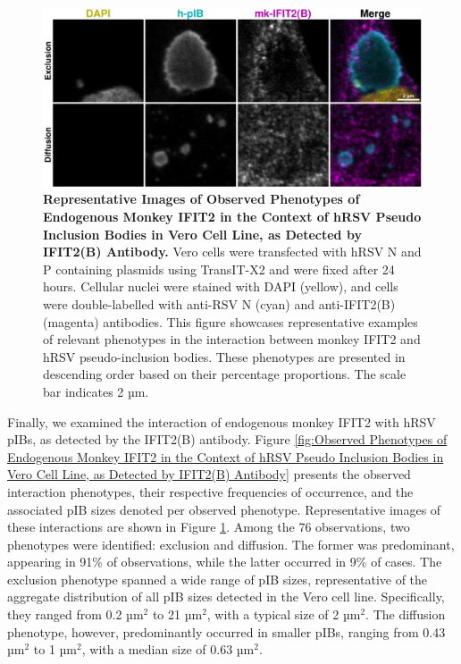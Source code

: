 \begin{figure}
    \centering
    \includegraphics[width=1\linewidth]{09. Chapter 4/Figs/01. pIB/03. IFIT2/03. IFIT2B/06. i2b-vero-hnhp.pdf} 
    \caption[Representative Images of Observed Phenotypes of Endogenous Monkey IFIT2 in the Context of hRSV Pseudo Inclusion Bodies in Vero Cell Line, as Detected by IFIT2(B) Antibody.]{\textbf{Representative Images of Observed Phenotypes of Endogenous Monkey IFIT2 in the Context of hRSV Pseudo Inclusion Bodies in Vero Cell Line, as Detected by IFIT2(B) Antibody.} Vero cells were transfected with hRSV N and P containing plasmids using TransIT-X2 and were fixed after 24 hours. Cellular nuclei were stained with DAPI (yellow), and cells were double-labelled with anti-RSV N (cyan) and anti-IFIT2(B) (magenta) antibodies. This figure showcases representative examples of relevant phenotypes in the interaction between monkey IFIT2 and hRSV pseudo-inclusion bodies. These phenotypes are presented in descending order based on their percentage proportions. The scale bar indicates 2 µm.}
    \label{fig:Representative Images of Observed Phenotypes of Endogenous Monkey IFIT2 in the Context of hRSV Pseudo Inclusion Bodies in Vero Cell Line, as Detected by IFIT2(B) Antibody}
\end{figure}

Finally, we examined the interaction of endogenous monkey IFIT2 with hRSV pIBs, as detected by the IFIT2(B) antibody. Figure \ref{fig:Observed Phenotypes of Endogenous Monkey IFIT2 in the Context of hRSV Pseudo Inclusion Bodies in Vero Cell Line, as Detected by IFIT2(B) Antibody} presents the observed interaction phenotypes, their respective frequencies of occurrence, and the associated pIB sizes denoted per observed phenotype. Representative images of these interactions are shown in Figure \ref{fig:Representative Images of Observed Phenotypes of Endogenous Monkey IFIT2 in the Context of hRSV Pseudo Inclusion Bodies in Vero Cell Line, as Detected by IFIT2(B) Antibody}. Among the 76 observations, two phenotypes were identified: exclusion and diffusion. The former was predominant, appearing in 91\% of observations, while the latter occurred in 9\% of cases. The exclusion phenotype spanned a wide range of pIB sizes, representative of the aggregate distribution of all pIB sizes detected in the Vero cell line. Specifically, they ranged from 0.2 \(\mbox{µm}^2\) to 21 \(\mbox{µm}^2\), with a typical size of 2 \(\mbox{µm}^2\). The diffusion phenotype, however, predominantly occurred in smaller pIBs, ranging from 0.43 \(\mbox{µm}^2\) to 1 \(\mbox{µm}^2\), with a median size of 0.63 \(\mbox{µm}^2\).

